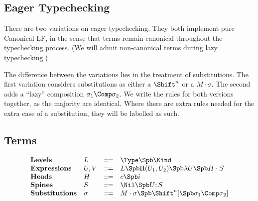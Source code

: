

\newcommand{\CheckTy}[3][\Gamma]{#1\vdash #2 \Leftarrow #3}
\newcommand{\Focus}[4][\Gamma]{#1\vdash #2 : #3 > #4}
\newcommand{\Equiv}[2]{#1\equiv #2}


\subsection{Eager Typechecking}

There are two variations on eager typechecking. 
They both implement pure Canonical LF, in the sense that
terms remain canonical throughout the typechecking process.
(We will admit non-canonical terms during lazy typechecking.)

The difference between the variations lies in the treatment
of substitutions. The first variation
considers substitutions as either a $\Shift^n$ or a $M\cdot\sigma$.
The second adds a ``lazy'' composition $\sigma_1\Comp\sigma_2$.
We write the rules for both versions together, as the majority
are identical.  Where there are extra rules needed for the
extra case of a substitution, they will be labelled as such.


\subsection{Terms}

$$
\begin{array}{llll}
\mathbf{Levels} & L & ::= & \Type \Spb \Kind \\
\mathbf{Expressions} & U,V & ::= & L \Spb \Pi(U_1,U_2) \Spb \lambda U \Spb H\cdot S \\
\mathbf{Heads} & H & ::= & c \Spb i\\
\mathbf{Spines} & S & ::= & \Nil \Spb U;S\\
\mathbf{Substitutions} & \sigma & ::= & M\cdot\sigma \Spb \Shift^n [\Spb \sigma_1 \Comp \sigma_2]\\
\end{array} 
$$



